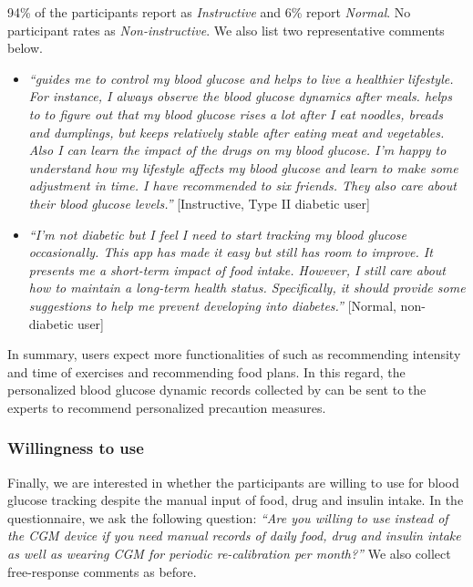 {94\% of the participants report \sysname as \textit{Instructive} and 6\% report \textit{Normal}.
No participant rates \sysname as \textit{Non-instructive}.
We also list two representative comments below.
\begin{itemize}
  \item  
  \textit{``\sysname guides me to control my blood glucose and helps to live a healthier lifestyle.
  For instance, I always observe the blood glucose dynamics after meals. 
  \sysname helps to to figure out that my blood glucose rises a lot after I eat noodles, breads and dumplings, but keeps relatively stable after eating meat and vegetables.
  Also I can learn the impact of the drugs on my blood glucose.
  I'm happy to understand how my lifestyle affects my blood glucose and learn to make some adjustment in time.
  I have recommended \sysname to six friends.
  They also care about their blood glucose levels.''}
  [Instructive, Type II diabetic user]
  \item  
  \textit{``I'm not diabetic but I feel I need to start tracking my blood glucose occasionally.
  This app has made it easy but still has room to improve.
  It presents me a short-term impact of food intake.  
  However, I still care about how to maintain a long-term health status. 
  Specifically, it should provide some suggestions to help me prevent developing into diabetes.''} 
  [Normal, non-diabetic user]
\end{itemize}
In summary, users expect more functionalities of \sysname such as recommending intensity and time of exercises and recommending food plans. 
In this regard, the personalized blood glucose dynamic records collected by \sysname can be sent to the experts to recommend personalized precaution measures.

\subsubsection{Willingness to use \sysname}
Finally, we are interested in whether the participants are willing to use \sysname for blood glucose tracking despite the manual input of food, drug and insulin intake.
In the questionnaire, we ask the following question:
\textit{``Are you willing to use \sysname instead of the CGM device if you need manual records of daily food, drug and insulin intake as well as wearing CGM for periodic re-calibration per month?''}
We also collect free-response comments as before.

}
